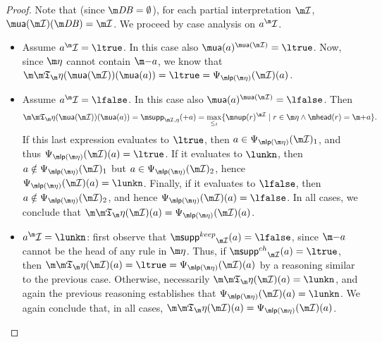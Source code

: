 \begin{proof}
{  Note that (since $\db=\emptyset$), for each partial interpretation $\pstruct$, $\actof(\pstruct) (\db) = \pstruct$. 
  We proceed by case analysis on $a^\pstruct$.
  \begin{itemize}
  \item Assume $a^\pstruct=\ltrue$. In this case also $\actof(a)^{\actof(\pstruct)}=\ltrue$. Now, since $\aics$ cannot contain $\remove a$, we know that $\Ap(\actof(\pstruct))(\actof(a))=\ltrue=\Psi_{\lpop(\aics)}(\pstruct)(a)$.
  \item Assume $a^\pstruct=\lfalse$. In this case also $\actof(a)^{\actof(\pstruct)}=\lfalse$. Then 
  \[ \Ap(\actof(\pstruct))(\actof(a))=\supp_{\pstruct,\eta}(+a)=\max_{\leq_t}\{\nup(r)^{\pstruct}\mid r\in \aics \land \head(r) =\add a\}.\]
    If this last expression evaluates to $\ltrue$, then $a\in\Psi_{\lpop(\aics)}(\pstruct)_1$, and thus $\Psi_{\lpop(\aics)}(\pstruct)(a)=\ltrue$.
    If it evaluates to $\lunkn$, then $a\notin\Psi_{\lpop(\aics)}(\pstruct)_1$ but $a\in\Psi_{\lpop(\aics)}(\pstruct)_2$, hence $\Psi_{\lpop(\aics)}(\pstruct)(a)=\lunkn$.
    Finally, if it evaluates to $\lfalse$, then $a\notin\Psi_{\lpop(\aics)}(\pstruct)_2$, and hence $\Psi_{\lpop(\aics)}(\pstruct)(a)=\lfalse$.
    In all cases, we conclude that $\Ap(\pstruct)(a)=\Psi_{\lpop(\aics)}(\pstruct)(a)$.
  \item $a^\pstruct=\lunkn$: first observe that $\suppout_{\pstruct}(a)=\lfalse$, since $\remove a$ cannot be the head of any rule in $\aics$.
    Thus, if $\suppin_{\pstruct}(a)=\ltrue$, then $\Ap(\pstruct)(a)=\ltrue=\Psi_{\lpop(\aics)}(\pstruct)(a)$ by a reasoning similar to the previous case.
    Otherwise, necessarily $\Ap(\pstruct)(a)=\lunkn$, and again the previous reasoning establishes that $\Psi_{\lpop(\aics)}(\pstruct)(a)=\lunkn$.
    We again conclude that, in all cases, $\Ap(\pstruct)(a)=\Psi_{\lpop(\aics)}(\pstruct)(a)$.
  \end{itemize}
}
\end{proof}



